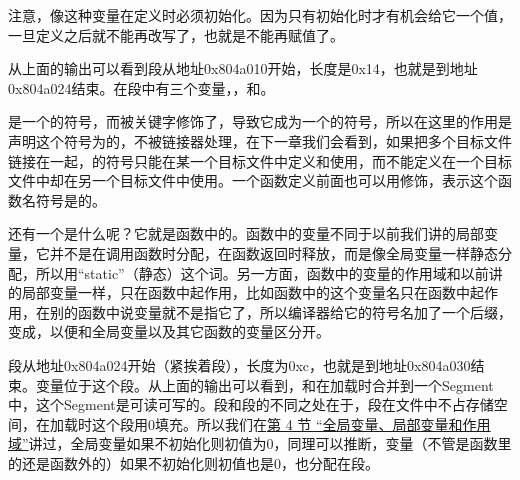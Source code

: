 

注意，像这种变量在定义时必须初始化。因为只有初始化时才有机会给它一个值，一旦定义之后就不能再改写了，也就是不能再赋值了。



从上面的输出可以看到段从地址0x804a010开始，长度是0x14，也就是到地址0x804a024结束。在段中有三个变量，，和。



是一个的符号，而被关键字修饰了，导致它成为一个的符号，所以在这里的作用是声明这个符号为的，不被链接器处理，在下一章我们会看到，如果把多个目标文件链接在一起，的符号只能在某一个目标文件中定义和使用，而不能定义在一个目标文件中却在另一个目标文件中使用。一个函数定义前面也可以用修饰，表示这个函数名符号是的。



还有一个是什么呢？它就是函数中的。函数中的变量不同于以前我们讲的局部变量，它并不是在调用函数时分配，在函数返回时释放，而是像全局变量一样静态分配，所以用“static”（静态）这个词。另一方面，函数中的变量的作用域和以前讲的局部变量一样，只在函数中起作用，比如函数中的这个变量名只在函数中起作用，在别的函数中说变量就不是指它了，所以编译器给它的符号名加了一个后缀，变成，以便和全局变量以及其它函数的变量区分开。



段从地址0x804a024开始（紧挨着段），长度为0xc，也就是到地址0x804a030结束。变量位于这个段。从上面的输出可以看到，和在加载时合并到一个Segment中，这个Segment是可读可写的。段和段的不同之处在于，段在文件中不占存储空间，在加载时这个段用0填充。所以我们在\hyperlink{db.ch03s04.id2714471}{第 4 节 “全局变量、局部变量和作用域”}讲过，全局变量如果不初始化则初值为0，同理可以推断，变量（不管是函数里的还是函数外的）如果不初始化则初值也是0，也分配在段。



